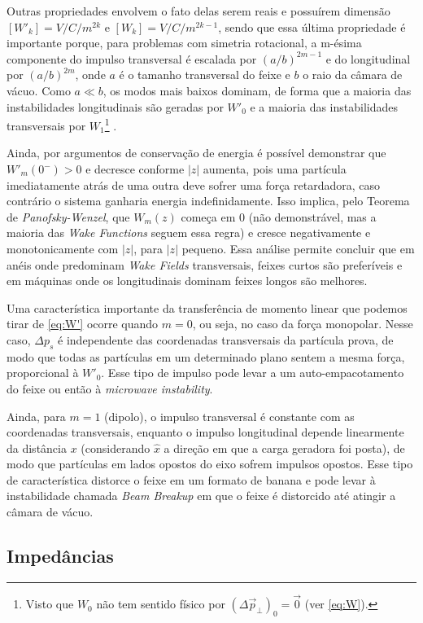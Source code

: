 Outras propriedades envolvem o fato delas serem reais e possuírem dimensão $[W'_k] = V/C/m^{2k}$ e $[W_k] = V/C/m^{2k-1}$, sendo que essa última propriedade é importante porque, para problemas com simetria rotacional, a m-ésima componente do impulso transversal é escalada por $(a/b)^{2m-1}$ e do longitudinal por $(a/b)^{2m}$, onde $a$ é o tamanho transversal do feixe e $b$ o raio da câmara de vácuo. Como $a\ll b$, os modos mais baixos dominam, de forma que a maioria das instabilidades longitudinais são geradas por $W'_0$ e a maioria das instabilidades transversais por $W_1$\footnote{Visto que $W_0$ não tem sentido físico por $(\Delta \vec{p}_\bot)_0 = \vec{0}$ (ver \eqref{eq:W}).} \cite{Chao, Bio}.

Ainda, por argumentos de conservação de energia \cite{Chao, Bio} é possível demonstrar que $ W'_m(0^-)>0$ e decresce conforme $|z|$ aumenta, pois uma partícula imediatamente atrás de uma outra deve sofrer uma força retardadora, caso contrário o sistema ganharia energia indefinidamente. Isso implica, pelo Teorema de \textit{Panofsky-Wenzel}, que $W_m(z)$ começa em $0$ (não demonstrável, mas a maioria das \textit{Wake Functions} seguem essa regra) e cresce negativamente e monotonicamente com $|z|$, para $|z|$ pequeno. Essa análise permite concluir que em anéis onde predominam \textit{Wake Fields} transversais, feixes curtos são preferíveis e em máquinas onde os longitudinais dominam feixes longos são melhores.

Uma característica importante da transferência de momento linear que podemos tirar de \eqref{eq:W'} ocorre quando $m=0$, ou seja, no caso da força monopolar. Nesse caso, $\Delta p_s$ é independente das coordenadas transversais da partícula prova, de modo que todas as partículas em um determinado plano sentem a mesma força, proporcional à $W'_0$. Esse tipo de impulso pode levar a um auto-empacotamento do feixe ou então à \textit{microwave instability}.

Ainda, para $m=1$ (dipolo), o impulso transversal é constante com as coordenadas transversais, enquanto o impulso longitudinal depende linearmente da distância $x$ (considerando $\hat{x}$ a direção em que a carga geradora foi posta), de modo que partículas em lados opostos do eixo sofrem impulsos opostos. Esse tipo
de característica distorce o feixe em um formato de banana e pode levar à instabilidade chamada \textit{Beam Breakup} em que o feixe é distorcido até atingir a câmara de vácuo.

\subsection{Impedâncias}

